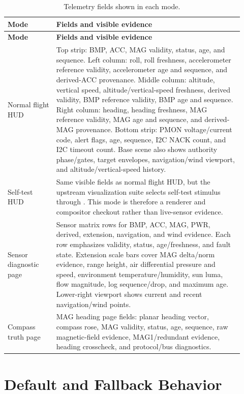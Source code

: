 \documentclass[12pt,letterpaper,final,onecolumn,titlepage]{article}
\DeclareRobustCommand{\sig}[1]{\texttt{\detokenize{#1}}}
\begin{document}
\begin{longtable}{L{0.19\linewidth} L{0.73\linewidth}}
\caption{Telemetry fields shown in each mode.}
\label{tab:telemetry-by-mode}\\
\toprule
\textbf{Mode} & \textbf{Fields and visible evidence} \\
\midrule
\endfirsthead
\toprule
\textbf{Mode} & \textbf{Fields and visible evidence} \\
\midrule
\endhead
Normal flight HUD &
Top strip: BMP, ACC, MAG validity, status, age, and sequence.  Left column:
roll, roll freshness, accelerometer reference validity, accelerometer age and
sequence, and derived-ACC provenance.  Middle column: altitude, vertical speed,
altitude/vertical-speed freshness, derived validity, BMP reference validity,
BMP age and sequence.  Right column: heading, heading freshness, MAG reference
validity, MAG age and sequence, and derived-MAG provenance.  Bottom strip:
PMON voltage/current code, alert flags, age, sequence, I2C NACK count, and I2C
timeout count.  Base scene also shows authority phase/gates, target envelopes,
navigation/wind viewport, and altitude/vertical-speed history. \\
Self-test HUD &
Same visible fields as normal flight HUD, but the upstream visualization suite
selects self-test stimulus through \sig{flight_selftest_en_sys}.  This mode is
therefore a renderer and compositor checkout rather than live-sensor evidence. \\
Sensor diagnostic page &
Sensor matrix rows for BMP, ACC, MAG, PWR, derived, extension, navigation, and
wind evidence.  Each row emphasizes validity, status, age/freshness, and fault
state.  Extension scale bars cover MAG delta/norm evidence, range height, air
differential pressure and speed, environment temperature/humidity, sun luma,
flow magnitude, log sequence/drop, and maximum age.  Lower-right viewport shows
current and recent navigation/wind points. \\
Compass truth page &
MAG heading page fields: planar heading vector, compass rose, MAG validity,
status, age, sequence, raw magnetic-field evidence, MAG1/redundant evidence,
heading crosscheck, and protocol/bus diagnostics. \\
\bottomrule
\end{longtable}

\section{Default and Fallback Behavior}
\end{document}

